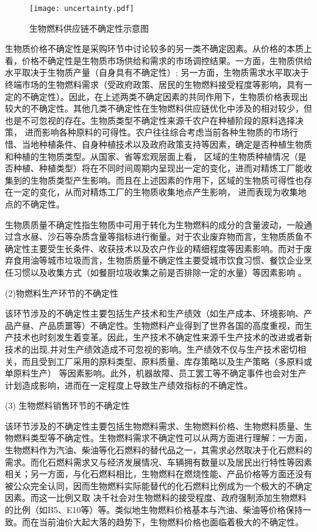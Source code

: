 \begin{figure}
	\centering
	\texttt{[image: uncertainty.pdf]}
	\caption{生物燃料供应链不确定性示意图}
	\label{fig:uncertainty}
\end{figure}

生物质价格不确定性是采购环节中讨论较多的另一类不确定因素。从价格的本质上看，价格不确定性是生物质市场供给和需求的市场调控结果。一方面，生物质供给水平取决于生物质产量（自身具有不确定性）\cite{Langholtz2014}; 另一方面，生物质需求水平取决于终端市场的生物燃料需求（受政府政策、居民的生物燃料接受程度等影响，具有一定的不确定性）。因此，在上述两类不确定因素的共同作用下，生物质价格表现出较大的不确定性。其他几类不确定性在生物燃料供应链优化中涉及的相对较少，但也是不可忽视的存在。生物质类型不确定性来源千农户在种植阶段的原料选择决策， 进而影响各种原料的可得性\cite{Seay2014}。农户往往综合考虑当前各种生物质的市场行惜、当地种植条件、自身种植技术以及政府政策支持等因素，确定是否种植生物质和种植的生物质类型。从国家、省等宏观层面上看， 区域的生物质种植情况（是否种植、种植类型）将在不同时间周期内呈现出一定的变化，进而对精炼工厂能收集到的生物质类型产生影响。而且在上述因素的作用下，区域的生物质可得性也存在一定的变化，从而对精炼工厂的生物质收集地点产生影响， 进而表现为收集地点的不确定性。

生物质质量不确定性指生物质中可用于转化为生物燃料的成分的含量波动，一般通过含水昼、沙石等杂质含量等指标进行衡量。对于农业废弃物而言，生物质质鱼不确定性主要受生长条件、收获技术以及农户作业的精细程度等因素影响。而对于废弃食用油等城市垃圾而言，生物质质量不确定性主要受城市饮食习惯、餐饮企业烹任习惯以及收集方式（如餐厨垃圾收集之前是否排除一定的水量）等因素影响 。

(2)物燃料生产环节的不确定性

该环节涉及的不确定性主要包括生产技术和生产绩效（如生产成本、环境影响\cite{Hammond2008}、产品产昼、产品质噩等）不确定性。生物燃料产业得到了世界各国的高度重视，而生产技术也时刻发生着变革。因此，生产技术不确定性来源千生产技术的改进或者新技术的出现\cite{Seay2014},并对生产绩效造成不可忽视的影响\cite{Gude2013}。生产绩效不仅与生产技术密切相关，而且受到工厂采用的原料类型、原料质量、库存策略以及生产策略（多原料或单原料生产） 等因素影响。此外，机器故障、员工罢工等不确定事件也会对生产计划造成影响，进而在一定程度上导致生产绩效指标的不确定性。

(3)	生物燃料销售环节的不确定性

该环节涉及的不确定性主要包括生物燃料需求、生物燃料价格、生物燃料质量、生物燃料类型等不确定性。生物燃料需求不确定性可以从两方面进行理解：一方面，生物燃料作为汽油、柴油等化石燃料的替代品之一，其需求必然取决于化石燃料的需求。而化石燃料需求又与经济发展情况、车辆拥有数量以及居民出行特性等因素相关；另一方面，与化石燃料相比，生物燃料在燃烧性能、产品价格等方面还没有被公众完全认同，因而生物燃料实际能替代的化石燃料比例成为一个极大的不确定因素。而这一比例又取 决千社会对生物燃料的接受程度、政府强制添加生物燃料的比例（如B5、E10等）等。类似地生物燃料价格基本与汽油、柴油等价格保持一致。而在当前油价大起大落的趋势下，生物燃料价格也面临着极大的不确定性\cite{Seay2014}\cite{Langholtz2014}。

